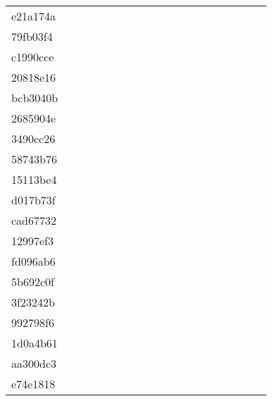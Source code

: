 \begin{table*}[htb]
\begin{tabular}{l|cccccccccccccccccc}
e21a174a  & \C & \X & \C & \X & \X & \X & \X & \C & \C & \X & \C & \C & \C & \C & \C & \X & \C \\
79fb03f4  & \X & \X & \X & \X & \X & \X & \X & \X & \X & \X & \X & \X & \X & \X & \X & \X & \X \\
c1990cce  & \C & \X & \X & \X & \X & \C & \C & \X & \X & \X & \X & \X & \X & \C & \C & \X & \X \\
20818e16  & \C & \X & \X & \X & \X & \X & \X & \X & \X & \X & \X & \X & \X & \C & \C & \X & \X \\
bcb3040b  & \C & \X & \X & \X & \X & \X & \X & \X & \C & \X & \X & \C & \C & \C & \C & \X & \C \\
2685904e  & \C & \X & \X & \X & \X & \X & \X & \X & \X & \X & \C & \C & \C & \C & \C & \X & \X \\
3490cc26  & \C & \X & \X & \X & \X & \X & \X & \X & \X & \X & \X & \X & \X & \C & \C & \X & \X \\
58743b76  & \C & \X & \X & \X & \X & \X & \X & \X & \X & \X & \X & \X & \X & \C & \C & \C & \X \\
15113be4  & \C & \X & \X & \X & \X & \X & \X & \X & \X & \X & \X & \X & \X & \C & \C & \X & \X \\
d017b73f  & \C & \X & \X & \X & \X & \X & \X & \X & \X & \X & \X & \C & \X & \X & \C & \X & \X \\
cad67732  & \C & \X & \X & \X & \X & \X & \X & \X & \X & \X & \X & \X & \X & \C & \C & \C & \C \\
12997ef3  & \C & \X & \C & \X & \X & \X & \X & \X & \C & \X & \C & \C & \C & \C & \C & \C & \C \\
fd096ab6  & \C & \X & \X & \X & \X & \X & \X & \X & \X & \X & \X & \X & \X & \X & \C & \X & \X \\
5b692c0f  & \C & \X & \X & \X & \X & \X & \X & \X & \X & \X & \X & \X & \X & \X & \C & \X & \X \\
3f23242b  & \C & \X & \X & \X & \X & \X & \X & \X & \X & \X & \X & \C & \C & \C & \C & \C & \X \\
992798f6  & \C & \X & \X & \X & \X & \C & \X & \X & \X & \X & \X & \X & \X & \C & \C & \X & \C \\
1d0a4b61  & \C & \X & \X & \C & \X & \C & \C & \C & \C & \X & \C & \X & \C & \C & \C & \C & \C \\
aa300dc3  & \C & \X & \X & \X & \X & \X & \X & \C & \X & \X & \C & \C & \C & \C & \C & \C & \X \\
e74e1818  & \C & \X & \X & \X & \X & \X & \X & \C & \X & \X & \C & \C & \C & \C & \C & \X & \X \\

\end{tabular}
\end{table*}
